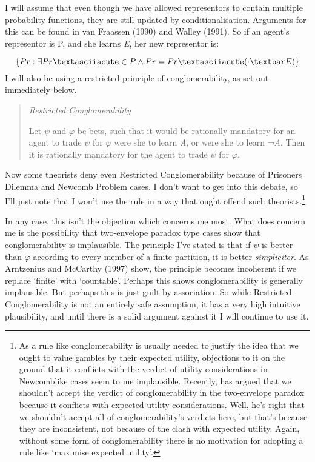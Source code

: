 I will assume that even though we have allowed representors to contain
multiple probability functions, they are still updated by
conditionalisation. Arguments for this can be found in van Fraassen
(1990) and Walley (1991). So if an agent's representor is P, and she
learns \emph{E}, her new representor is:

\begin{equation}
\{Pr: \exists Pr´ \in P \wedge Pr = Pr´( \cdot \textbar E)\}
\end{equation}
I will also be using a restricted principle of conglomerability, as set
out immediately below.

\begin{quote}
\emph{Restricted Conglomerability}

Let $\psi$ and $\varphi$ be bets, such that it would be rationally mandatory for an
agent to trade $\psi$ for $\varphi$ were she to learn \emph{A}, or were she to learn
¬\emph{A}. Then it is rationally mandatory for the agent to trade $\psi$ for
$\varphi$.
\end{quote}
Now some theorists deny even Restricted Conglomerability because of
Prisoners Dilemma and Newcomb Problem cases. I don't want to get into
this debate, so I'll just note that I won't use the rule in a way that
ought offend such theorists.\footnote{As a rule like conglomerability is
  usually needed to justify the idea that we ought to value gambles by
  their expected utility, objections to it on the ground that it
  conflicts with the verdict of utility considerations in Newcomblike
  cases seem to me implausible. Recently, \citet{Norton1998} has argued that
  we shouldn't accept the verdict of conglomerability in the
  two-envelope paradox because it conflicts with expected utility
  considerations. Well, he's right that we shouldn't accept all of
  conglomerability's verdicts here, but that's because they are
  inconsistent, not because of the clash with expected utility. Again,
  without some form of conglomerability there is no motivation for
  adopting a rule like `maximise expected utility'.}

In any case, this isn't the objection which concerns me most. What does
concern me is the possibility that two-envelope paradox type cases show
that conglomerability is implausible. The principle I've stated is that
if $\psi$ is better than $\varphi$ according to every member of a finite partition,
it is better \emph{simpliciter}. As Arntzenius and McCarthy (1997) show,
the principle becomes incoherent if we replace `finite' with
`countable'. Perhaps this shows conglomerability is generally
implausible. But perhaps this is just guilt by association. So while
Restricted Conglomerability is not an entirely safe assumption, it has a
very high intuitive plausibility, and until there is a solid argument
against it I will continue to use it.

